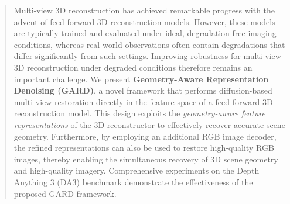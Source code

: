 \begin{abstract}


Multi-view 3D reconstruction has achieved remarkable progress with the advent of feed-forward 3D reconstruction models. However, these models are typically trained and evaluated under ideal, degradation-free imaging conditions, whereas real-world observations often contain degradations that differ significantly from such settings. Improving robustness for multi-view 3D reconstruction under degraded conditions therefore remains an important challenge. We present \textbf{Geometry-Aware Representation Denoising (GARD)}, a novel framework that performs diffusion-based multi-view restoration directly in the feature space of a feed-forward 3D reconstruction model. This design exploits the \textit{geometry-aware feature representations} of the 3D reconstructor to effectively recover accurate scene geometry. Furthermore, by employing an additional RGB image decoder, the refined representations can also be used to restore high-quality RGB images, thereby enabling the simultaneous recovery of 3D scene geometry and high-quality imagery. Comprehensive experiments on the Depth Anything 3 (DA3) benchmark demonstrate the effectiveness of the proposed GARD framework. 




\end{abstract}


